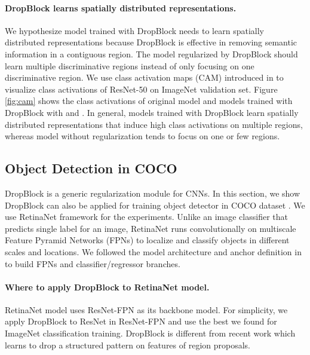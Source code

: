 \documentclass{article}
\begin{document}
\paragraph{DropBlock learns spatially distributed representations.} We hypothesize model trained with DropBlock needs to learn spatially distributed representations because DropBlock is effective in removing semantic information in a contiguous region. The model regularized by DropBlock should learn multiple discriminative regions instead of only focusing on one discriminative region. We use class activation maps (CAM) introduced in \cite{zhou2016dcam} to visualize  class activations of ResNet-50 on ImageNet validation set. Figure \ref{fig:cam} shows the class activations of original model and models trained with DropBlock with  and . In general, models trained with DropBlock learn spatially distributed representations that induce high class activations on multiple regions, whereas model without regularization tends to focus on one or few regions.


\subsection{Object Detection in COCO}
DropBlock is a generic regularization module for CNNs. In this section, we show DropBlock can also be applied for training object detector in COCO dataset \cite{lin2014coco}. We use RetinaNet \cite{lin2017focalloss} framework for the experiments. Unlike an image classifier that predicts single label for an image, RetinaNet runs convolutionally on multiscale Feature Pyramid Networks (FPNs) \cite{lin2017fpn} to localize and classify objects in different scales and locations. We followed the model architecture and anchor definition in \cite{lin2017focalloss} to build FPNs and classifier/regressor branches.

\paragraph{Where to apply DropBlock to RetinaNet model.}
RetinaNet model uses ResNet-FPN as its backbone model. For simplicity, we apply DropBlock to ResNet in ResNet-FPN and use the best  we found for ImageNet classification training. DropBlock is different from recent work \cite{afastrcnn2017} which learns to drop a structured pattern on features of region proposals.
\end{document}
